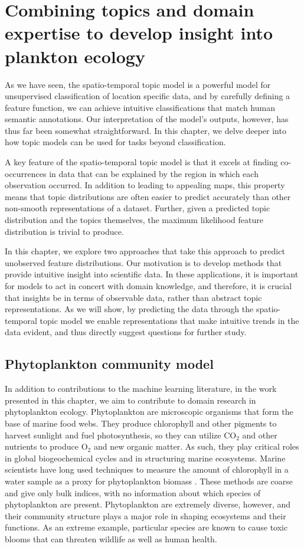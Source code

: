 
\chapter{Combining topics and domain expertise to develop insight into plankton ecology} \label{ch:plankton}

As we have seen, the spatio-temporal topic model is a powerful model for unsupervised classification of location specific data, and by carefully defining a feature function, we can achieve intuitive classifications that match human semantic annotations. Our interpretation of the model's outputs, however, has thus far been somewhat straightforward. In this chapter, we delve deeper into how topic models can be used for tasks beyond classification.

A key feature of the spatio-temporal topic model is that it excels at finding co-occurrences in data that can be explained by the region in which each observation occurred. In addition to leading to appealing maps, this property means that topic distributions are often easier to predict accurately than other non-smooth representations of a dataset. Further, given a predicted topic distribution and the topics themselves, the maximum likelihood feature distribution is trivial to produce.

In this chapter, we explore two approaches that take this approach to predict unobserved feature distributions. Our motivation is to develop methods that provide intuitive insight into scientific data. In these applications, it is important for models to act in concert with domain knowledge, and therefore, it is crucial that insights be in terms of observable data, rather than abstract topic representations. As we will show, by predicting the data through the spatio-temporal topic model we enable representations that make intuitive trends in the data evident, and thus directly suggest questions for further study.

\section{Phytoplankton community model}
In addition to contributions to the machine learning literature, in the work presented in this chapter, we aim to contribute to domain research in phytoplankton ecology. Phytoplankton are microscopic organisms that form the base of marine food webs. They produce chlorophyll and other pigments to harvest sunlight and fuel photosynthesis, so they can utilize $\mathrm{CO}_2$ and other nutrients to produce $\mathrm{O}_2$ and new organic matter. As such, they play critical roles in global biogeochemical cycles and in structuring marine ecosystems.  
Marine scientists have long used techniques to measure the amount of chlorophyll in a water sample as a proxy for phytoplankton biomass \citep{Lorenzen1966}. These methods are coarse and give only bulk indices, with no information about which species of phytoplankton are present. Phytoplankton are extremely diverse, however, and their community structure plays a major role in shaping ecosystems and their functions. As an extreme example, particular species are known to cause toxic blooms that can threaten wildlife as well as human health.

